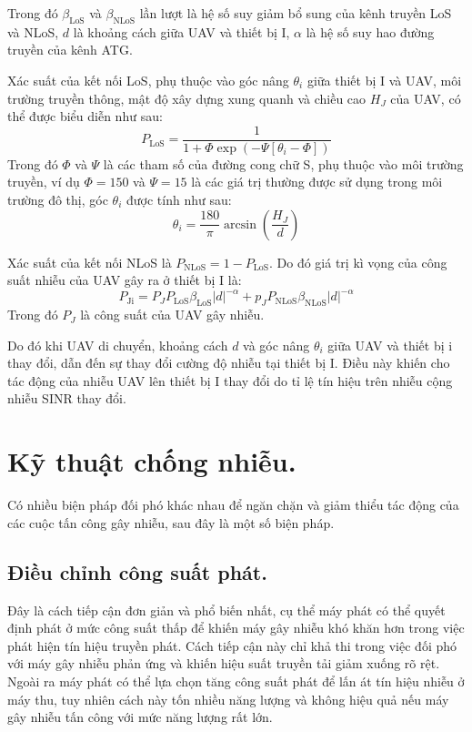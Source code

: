 \documentclass{uetgraduation}
\begin{document}
Trong đó $\beta_\text{LoS}$ và $\beta_\text{NLoS}$ lần lượt là hệ số suy giảm bổ sung của kênh truyền LoS và NLoS, $d$ là khoảng cách giữa UAV và thiết bị I,
$\alpha$ là hệ số suy hao đường truyền của kênh ATG. 

Xác suất của kết nối LoS, phụ thuộc vào góc nâng $\theta_i$ giữa thiết bị I và UAV, môi trường truyền thông, mật độ xây dựng xung quanh và chiều cao $H_J$ của UAV,
có thể được biểu diễn như sau:
\[
P_\text{LoS} = \frac{1}{1 + \Phi \exp(-\Psi [\theta_i - \Phi])}
\]
Trong đó $\Phi$ và $\Psi$ là các tham số của đường cong chữ S, phụ thuộc vào môi trường truyền, ví dụ $\Phi = 150$ và $\Psi =15$ là các giá trị thường được sử dụng trong
môi trường đô thị, góc $\theta_i$ được tính như sau:
\[
\theta_i = \frac{180}{\pi} \arcsin(\frac{H_J}{d})
\]

Xác suất của kết nối NLoS là $P_\text{NLoS} = 1 - P_\text{LoS}$. Do đó giá trị kì vọng của công suất nhiễu của UAV gây ra ở thiết bị I là:
\[
P_\text{Ji} = P_J P_\text{LoS} \beta_\text{LoS} |d|^{-\alpha} + p_J P_\text{NLoS} \beta_\text{NLoS} |d|^{-\alpha}
\]
Trong đó $P_J$ là công suất của UAV gây nhiễu.

Do đó khi UAV di chuyển, khoảng cách $d$ và góc nâng $\theta_i$ giữa UAV và thiết bị i thay đổi, dẫn đến sự thay đổi cường độ nhiễu tại thiết bị I.
Điều này khiến cho tác động của nhiễu UAV lên thiết bị I thay đổi do tỉ lệ tín hiệu trên nhiễu cộng nhiễu SINR thay đổi.


\section{Kỹ thuật chống nhiễu.}
Có nhiều biện pháp đối phó khác nhau để ngăn chặn và giảm thiểu tác động của các cuộc tấn công gây nhiễu, sau đây là một số biện pháp.

\subsection{Điều chỉnh công suất phát.}
Đây là cách tiếp cận đơn giản và phổ biến nhất, cụ thể máy phát có thể quyết định phát ở mức công suất thấp để khiến máy gây nhiễu khó khăn hơn trong việc phát hiện
tín hiệu truyền phát. Cách tiếp cận này chỉ khả thi trong việc đối phó với máy gây nhiễu phản ứng và khiến hiệu suất truyền tải giảm xuống rõ rệt. Ngoài ra máy phát
có thể lựa chọn tăng công suất phát để lấn át tín hiệu nhiễu ở máy thu, tuy nhiên cách này tốn nhiều năng lượng và không hiệu quả nếu máy gây nhiễu tấn công với mức
năng lượng rất lớn.
\end{document}
